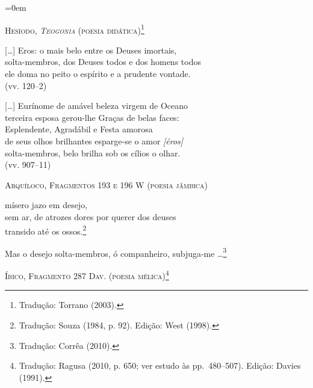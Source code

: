 \begin{hedraquote} \parindent=0em
{\centering
\textsc{Hesíodo, \textit{Teogonia} (poesia didática)\footnote{ Tradução:
Torrano (2003).}}
\par}

\smallskip

	[\ldots{}] Eros: o mais belo entre os Deuses imortais,\\
	solta-membros, dos Deuses todos e dos homens todos\\
	ele doma no peito o espírito e a prudente vontade.\\
	\mbox{}\hfill (vv. 120--2)

\smallskip

	\hspace*{2em}[\ldots{}] Eurínome de amável beleza virgem de Oceano\\
	\hspace*{4.5em}terceira esposa gerou-lhe Graças de belas faces:\\
	\hspace*{4.5em}Esplendente, Agradábil e Festa amorosa\\
	\hspace*{4.5em}de seus olhos brilhantes esparge-se o amor \textit{[éros]}\\
	\hspace*{4.5em}solta-membros, belo brilha sob os cílios o olhar.\\
	\mbox{}\hfill (vv. 907--11)

\bigskip

{\centering
\textsc{Arquíloco, Fragmentos 193 e 196 W (poesia jâmbica)}
\par}

\smallskip

	\hspace*{4.5em}mísero jazo em desejo,\\
	\hspace*{2em}sem ar, de atrozes dores por querer dos deuses\\
	\hspace*{4.5em}transido até os ossos.\footnote{ Tradução: Souza (1984, p. 92). Edição: West (1998).}

\smallskip

	Mas o desejo solta-membros, ó companheiro, subjuga-me
	\ldots{}\footnote{ Tradução: Corrêa (2010).}

\bigskip

{\centering
\textsc{Íbico, Fragmento 287 Dav. (poesia mélica)\footnote{ Tradução: Ragusa (2010, p.
650; ver estudo às pp.~480--507). Edição: Davies (1991).}}
\par}


\end{hedraquote}
